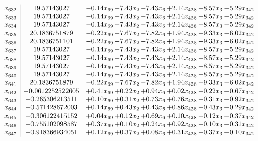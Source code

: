 \documentclass[8pt]{article}
\begin{document}
\[\begin{array}{c| c c@{\hskip 2pt} c@{\hskip 2pt} c@{\hskip 2pt} c@{\hskip 2pt} c@{\hskip 2pt} c@{\hskip 2pt} }
 x_{632}   &  19.57143027 & -0.14 x_{69} & -7.43 x_{2} & -7.43 x_{6} & +  2.14 x_{428} & +  8.57 x_{3} & -5.29 x_{342}\\
 x_{633}   &  19.57143027 & -0.14 x_{69} & -7.43 x_{2} & -7.43 x_{6} & +  2.14 x_{428} & +  8.57 x_{3} & -5.29 x_{342}\\
 x_{634}   &  19.57143027 & -0.14 x_{69} & -7.43 x_{2} & -7.43 x_{6} & +  2.14 x_{428} & +  8.57 x_{3} & -5.29 x_{342}\\
 x_{635}   &  20.1836751879 & -0.22 x_{69} & -7.67 x_{2} & -7.82 x_{6} & +  1.94 x_{428} & +  9.33 x_{3} & -6.02 x_{342}\\
 x_{636}   &  20.1836751101 & -0.22 x_{69} & -7.67 x_{2} & -7.82 x_{6} & +  1.94 x_{428} & +  9.33 x_{3} & -6.02 x_{342}\\
 x_{637}   &  19.57143027 & -0.14 x_{69} & -7.43 x_{2} & -7.43 x_{6} & +  2.14 x_{428} & +  8.57 x_{3} & -5.29 x_{342}\\
 x_{638}   &  19.57143027 & -0.14 x_{69} & -7.43 x_{2} & -7.43 x_{6} & +  2.14 x_{428} & +  8.57 x_{3} & -5.29 x_{342}\\
 x_{639}   &  19.57143027 & -0.14 x_{69} & -7.43 x_{2} & -7.43 x_{6} & +  2.14 x_{428} & +  8.57 x_{3} & -5.29 x_{342}\\
 x_{640}   &  19.57143027 & -0.14 x_{69} & -7.43 x_{2} & -7.43 x_{6} & +  2.14 x_{428} & +  8.57 x_{3} & -5.29 x_{342}\\
 x_{641}   &  20.1836751879 & -0.22 x_{69} & -7.67 x_{2} & -7.82 x_{6} & +  1.94 x_{428} & +  9.33 x_{3} & -6.02 x_{342}\\
 x_{642}   &  -0.0612252522605 & +  0.41 x_{69} & +  0.22 x_{2} & +  0.94 x_{6} & +  0.02 x_{428} & +  0.22 x_{3} & +  0.67 x_{342}\\
 x_{643}   &  -0.265306213511 & +  0.10 x_{69} & +  0.31 x_{2} & +  0.73 x_{6} & +  0.76 x_{428} & +  0.31 x_{3} & +  0.92 x_{342}\\
 x_{644}   &  -0.571428672003 & +  0.14 x_{69} & +  0.43 x_{2} & +  0.43 x_{6} & +  0.86 x_{428} & +  0.43 x_{3} & +  0.29 x_{342}\\
 x_{645}   &  -0.306122415152 & +  0.04 x_{69} & +  0.12 x_{2} & +  0.69 x_{6} & +  0.10 x_{428} & +  0.12 x_{3} & +  0.37 x_{342}\\
 x_{646}   &  -0.755102098587 & +  0.37 x_{69} & +  0.10 x_{2} & +  0.24 x_{6} & +  0.92 x_{428} & +  0.10 x_{3} & +  0.31 x_{342}\\
 x_{647}   &  -0.918366934051 & +  0.12 x_{69} & +  0.37 x_{2} & +  0.08 x_{6} & +  0.31 x_{428} & +  0.37 x_{3} & +  0.10 x_{342}\\

\end{array}\]
\end{document}
